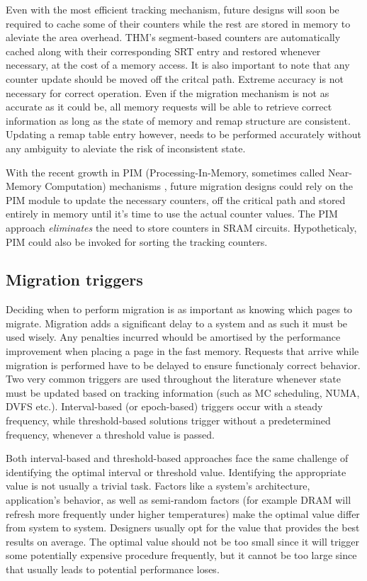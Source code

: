 Even with the most efficient tracking mechanism, future designs will soon be required to cache some of their counters while the rest are stored in memory to aleviate the area overhead. THM's segment-based counters are automatically cached along with their corresponding SRT entry and restored whenever necessary, at the cost of a memory access. It is also important to note that any counter update should be moved off the critcal path. Extreme accuracy is not necessary for correct operation. Even if the migration mechanism is not as accurate as it could be, all memory requests will be able to retrieve correct information as long as the state of memory and remap structure are consistent. Updating a remap table entry however, needs to be performed accurately without any ambiguity to aleviate the risk of inconsistent state.

 With the recent growth in PIM (Processing-In-Memory, sometimes called Near-Memory Computation) mechanisms \TODO{[cite]}, future migration designs could rely on the PIM module to update the necessary counters, off the critical path and stored entirely in memory until it's time to use the actual counter values. The PIM approach \textit{eliminates} the need to store counters in SRAM circuits. Hypotheticaly, PIM could also be invoked for sorting the tracking counters.

\subsection{Migration triggers}
Deciding when to perform migration is as important as knowing which pages to migrate. Migration adds a significant delay to a system and as such it must be used wisely. Any penalties incurred whould be amortised by the performance improvement when placing a page in the fast memory. Requests that arrive while migration is performed have to be delayed to ensure functionaly correct behavior. Two very common triggers are used throughout the literature whenever state must be updated based on tracking information (such as MC scheduling, NUMA, DVFS etc.). Interval-based (or epoch-based) triggers occur with a steady frequency, while threshold-based solutions trigger without a predetermined frequency, whenever a threshold value is passed. 

Both interval-based and threshold-based approaches face the same challenge of identifying the optimal interval or threshold value. Identifying the appropriate value is not usually a trivial task. Factors like a system's architecture, application's behavior, as well as semi-random factors (for example DRAM will refresh more frequently under higher temperatures) make the optimal value differ from system to system. Designers usually opt for the value that provides the best results on average. The optimal value should not be too small since it will trigger some potentially expensive procedure frequently, but it cannot be too large since that usually leads to potential performance loses. 

